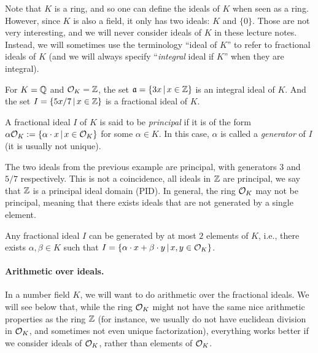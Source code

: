 Note that $K$ is a ring, and so one can define the ideals of $K$ when seen as a ring. However, since $K$ is also a field, it only has two ideals: $K$ and $\{0\}$. Those are not very interesting, and we will never consider ideals of $K$ in these lecture notes. Instead, we will sometimes use the terminology ``ideal of $K$'' to refer to fractional ideals of $K$ (and we will always specify ``\emph{integral} ideal if $K$'' when they are integral).

\begin{example}
For $K = \mathbb{Q}$ and $\mathcal{O}_K = \mathbb{Z}$, the set $\mathfrak{a} = \{3x\,|\, x \in \mathbb{Z}\}$ is an integral ideal of $K$. And the set $I = \{5x/7 \,|\, x \in \mathbb{Z}\}$ is a fractional ideal of $K$.
\end{example}

\begin{definition}
A fractional ideal $I$ of $K$ is said to be \emph{principal} if it is of the form $\alpha \mathcal{O}_K := \{ \alpha \cdot x\,|\, x \in \mathcal{O}_K\}$ for some $\alpha \in K$. In this case, $\alpha$ is called a \emph{generator} of $I$ (it is usually not unique).
\end{definition}

\begin{example}
The two ideals from the previous example are principal, with generators $3$ and $5/7$ respectively. This is not a coincidence, all ideals in $\mathbb{Z}$ are principal, we say that $\mathbb{Z}$ is a principal ideal domain (PID).
In general, the ring $\mathcal{O}_K$ may not be principal, meaning that there exists ideals that are not generated by a single element.
\end{example}

\begin{lemma}
\label{lemma:two-elm-rep}
Any fractional ideal $I$ can be generated by at most $2$ elements of $K$, i.e., there exists $\alpha, \beta \in K$ such that $I = \{ \alpha \cdot x + \beta \cdot y \,|\, x, y \in \mathcal{O}_K\}$.
\end{lemma}

\paragraph{Arithmetic over ideals.} In a number field $K$, we will want to do arithmetic over the fractional ideals. We will see below that, while the ring $\mathcal{O}_K$ might not have the same nice arithmetic properties as the ring $\mathbb{Z}$ (for instance, we usually do not have euclidean division in $\mathcal{O}_K$, and sometimes not even unique factorization), everything works better if we consider ideals of $\mathcal{O}_K$, rather than elements of $\mathcal{O}_K$.

